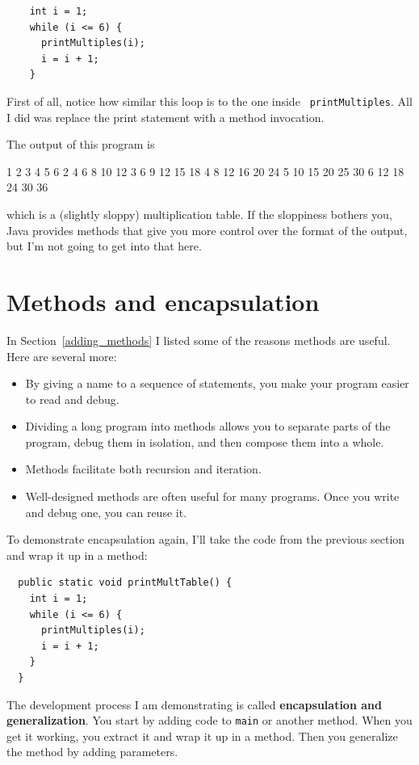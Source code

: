 \documentclass[12pt]{book}
\theoremstyle{exercise}
\begin{document}
\begin{lstlisting}
    int i = 1;
    while (i <= 6) {
      printMultiples(i);
      i = i + 1;
    }
\end{lstlisting}
%
First of all, notice how similar this loop is to the one inside {\tt
printMultiples}.  All I did was replace the print statement with a
method invocation.

The output of this program is

\begin{verbatimtab}
1   2   3   4   5   6
2   4   6   8   10   12
3   6   9   12   15   18
4   8   12   16   20   24
5   10   15   20   25   30
6   12   18   24   30   36
\end{verbatimtab}
%
which is a (slightly sloppy) multiplication table.  If the
sloppiness bothers you, Java provides methods that give you
more control over the format of the output, but I'm not
going to get into that here.


\section{Methods and encapsulation}
\label{methods}

In Section~\ref{adding_methods} I listed some of the
reasons methods are useful.  Here are several more:

\begin{itemize}

\item By giving a name to a sequence of statements, you make
your program easier to read and debug.

\item Dividing a long program into methods allows you to
separate parts of the program, debug them in isolation, and
then compose them into a whole.

\item Methods facilitate both recursion and iteration.

\item Well-designed methods are often useful for many programs.
Once you write and debug one, you can reuse it.

\end{itemize}

To demonstrate encapsulation again, I'll take the code
from the previous section and wrap it up in a method:

\begin{lstlisting}
  public static void printMultTable() {
    int i = 1;
    while (i <= 6) {
      printMultiples(i);
      i = i + 1;
    }
  }
\end{lstlisting}
%
The development process I am demonstrating is called
{\bf encapsulation and generalization}.
You start by adding
code to {\tt main} or another method.  When you get
it working, you extract it and wrap it up in a method.
Then you generalize the method by adding parameters.
\end{document}
